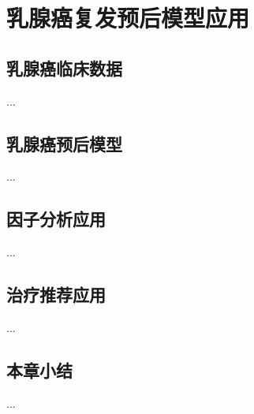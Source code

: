 \chapter{乳腺癌复发预后模型应用}

\section{乳腺癌临床数据}
...

\section{乳腺癌预后模型}
...

\section{因子分析应用}
...

\section{治疗推荐应用}
...

\section{本章小结}
...
